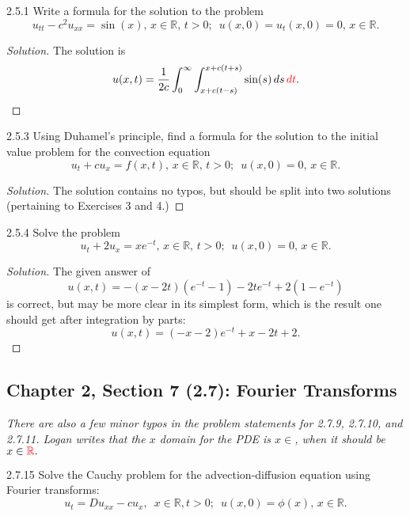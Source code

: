 \documentclass[11pt]{article}
\newenvironment{solution}
  {\renewcommand\qedsymbol{$\blacksquare$}\begin{proof}[Solution]}
  {\end{proof}}
\theoremstyle{definition}
\begin{document}
\begin{exercise}{2.5.1}
Write a formula for the solution to the problem  \[u_{tt} - c^2u_{xx} = \sin(x), \, x \in \mathbb{R}, \, t>0; \, \, \, u(x,0)= u_t(x, 0) = 0, \, x \in \mathbb{R}.\]
  \end{exercise}
  
  
\begin{solution}
  The solution is \[ u(x, t) = \frac{1}{2c} \int_0^{\infty} \int_{x+c(t-s)}^{x+c(t+s)} \sin(s) \, ds \, \textcolor{red}{dt}. \]
\end{solution}

\begin{exercise}{2.5.3}
Using Duhamel's principle, find a formula for the solution to the initial value problem for the convection equation
\[u_t +cu_x =f(x,t), \, x \in \mathbb{R}, \, t>0; \, \, \, u(x,0)=0, \, x \in \mathbb{R}.\]
\end{exercise}


\begin{solution}
The solution contains no typos, but should be split into two solutions (pertaining to Exercises 3 and 4.)
\end{solution}

\begin{exercise}{2.5.4}
Solve the problem 
\[u_t +2u_x = xe^{-t}, \, x \in \mathbb{R}, \, t>0; \, \, \, u(x,0)=0, \, x \in \mathbb{R}.\]
\end{exercise}

\begin{solution}
The given answer of \[u(x, t) = -(x - 2t)(e^{-t} - 1) - 2te^{-t} + 2(1 - e
^{-t})\] is correct, but may be more clear in its simplest form, which is the result one should get after integration by parts:
\[ u(x, t) = (-x-2)e^{-t} + x - 2t + 2.\]
\end{solution}


\setcounter{subsection}{6}
\subsection{Chapter 2, Section 7 (2.7): Fourier Transforms}

\textit{There are also a few minor typos in the problem statements for 2.7.9, 2.7.10, and 2.7.11. Logan writes that the $x$ domain for the PDE is $x \in$, when it should be $x \in \textcolor{red}{\mathbb{R}}.$}

\begin{exercise}{2.7.15}
Solve the Cauchy problem for the advection-diffusion equation using Fourier transforms:
\[ u_t = Du_{xx} - cu_x, \, \, \, x\in \mathbb{R}, t > 0; \, \, \, u(x, 0) = \phi(x), \, x \in \mathbb{R}.\]
\end{exercise}
\end{document}
